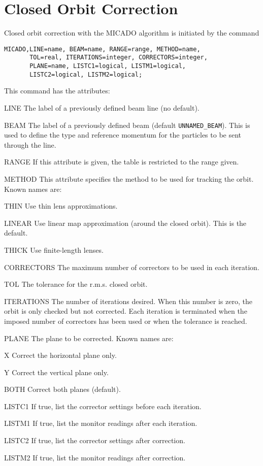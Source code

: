 \section{Closed Orbit Correction}
\label{sec:micado}
Closed orbit correction with the MICADO algorithm is initiated by the command
\begin{verbatim}
MICADO,LINE=name, BEAM=name, RANGE=range, METHOD=name,
       TOL=real, ITERATIONS=integer, CORRECTORS=integer,
       PLANE=name, LISTC1=logical, LISTM1=logical,
       LISTC2=logical, LISTM2=logical;
\end{verbatim}
This command has the attributes:
\begin{kdescription}
\item[LINE]
  The label of a previously defined beam line (no default).
\item[BEAM]
  The label of a previously defined beam (default \texttt{UNNAMED\_BEAM}).
  This is used to define the type and reference momentum for the
  particles to be sent through the line.
\item[RANGE]
  If this attribute is given, the table is restricted to the range given.
\item[METHOD]
  This attribute specifies the method to be used for tracking the orbit.
  Known names are:
  \begin{kdescription}
  \item[THIN]
    Use thin lens approximations.
  \item[LINEAR]
    Use linear map approximation (around the closed orbit).
    This is the default.
  \item[THICK]
    Use finite-length lenses.
  \end{kdescription}
\item[CORRECTORS]
  The maximum number of correctors to be used in each iteration.
\item[TOL]
  The tolerance for the r.m.s. closed orbit.
\item[ITERATIONS]
  The number of iterations desired.
  When this number is zero,
  the orbit is only checked but not corrected.
  Each iteration is terminated when the imposed number of correctors has been
  used or when the tolerance is reached.
\item[PLANE]
  The plane to be corrected.
  Known names are:
  \begin{kdescription}
  \item[X]
    Correct the horizontal plane only.
  \item[Y]
    Correct the vertical plane only.
  \item[BOTH]
    Correct both planes (default).
  \end{kdescription}
\item[LISTC1]
  If true, list the corrector settings before each iteration.
\item[LISTM1]
  If true, list the monitor readings after each iteration.
\item[LISTC2]
  If true, list the corrector settings after correction.
\item[LISTM2]
  If true, list the monitor readings after correction.
\end{kdescription}

